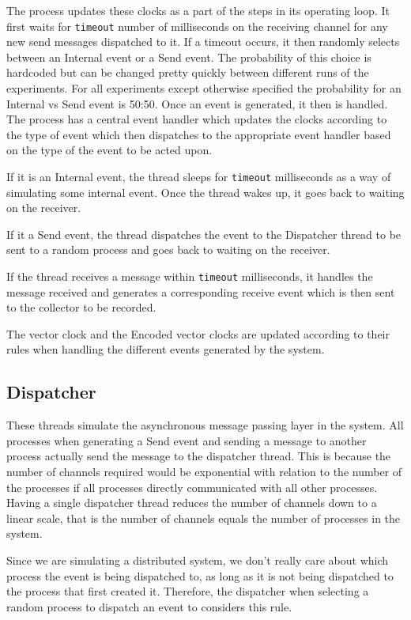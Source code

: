 \documentclass[]{article}
\begin{document}
The process updates these clocks as a part of the steps in its operating
loop. It first waits for \texttt{timeout} number of milliseconds on the
receiving channel for any new send messages dispatched to it. If a
timeout occurs, it then randomly selects between an Internal event or a
Send event. The probability of this choice is hardcoded but can be
changed pretty quickly between different runs of the experiments. For
all experiments except otherwise specified the probability for an
Internal vs Send event is 50:50. Once an event is generated, it then is
handled. The process has a central event handler which updates the
clocks according to the type of event which then dispatches to the
appropriate event handler based on the type of the event to be acted
upon.

If it is an Internal event, the thread sleeps for \texttt{timeout}
milliseconds as a way of simulating some internal event. Once the thread
wakes up, it goes back to waiting on the receiver.

If it a Send event, the thread dispatches the event to the Dispatcher
thread to be sent to a random process and goes back to waiting on the
receiver.

If the thread receives a message within \texttt{timeout} milliseconds,
it handles the message received and generates a corresponding receive
event which is then sent to the collector to be recorded.

The vector clock and the Encoded vector clocks are updated according to
their rules when handling the different events generated by the system.

\hypertarget{dispatcher}{%
\subsection{Dispatcher}\label{dispatcher}}

These threads simulate the asynchronous message passing layer in the
system. All processes when generating a Send event and sending a message
to another process actually send the message to the dispatcher thread.
This is because the number of channels required would be exponential
with relation to the number of the processes if all processes directly
communicated with all other processes. Having a single dispatcher thread
reduces the number of channels down to a linear scale, that is the
number of channels equals the number of processes in the system.

Since we are simulating a distributed system, we don't really care about
which process the event is being dispatched to, as long as it is not
being dispatched to the process that first created it. Therefore, the
dispatcher when selecting a random process to dispatch an event to
considers this rule.
\end{document}
